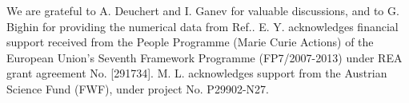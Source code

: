\documentclass[aps,prl,reprint,showpacs,floatfix]{revtex4-1}
\begin{document}
\begin{acknowledgments}
We are grateful to A. Deuchert and I. Ganev for valuable discussions, and to G. Bighin for providing the numerical data from Ref.\cite{bighin2018diagrammatic}. E. Y. acknowledges financial support received from the People Programme (Marie Curie Actions) of the European Union's Seventh Framework Programme (FP7/2007-2013) under REA grant agreement No. [291734]. M. L. acknowledges support from the Austrian Science Fund (FWF), under project No. P29902-N27.
\end{acknowledgments}




\end{document}
